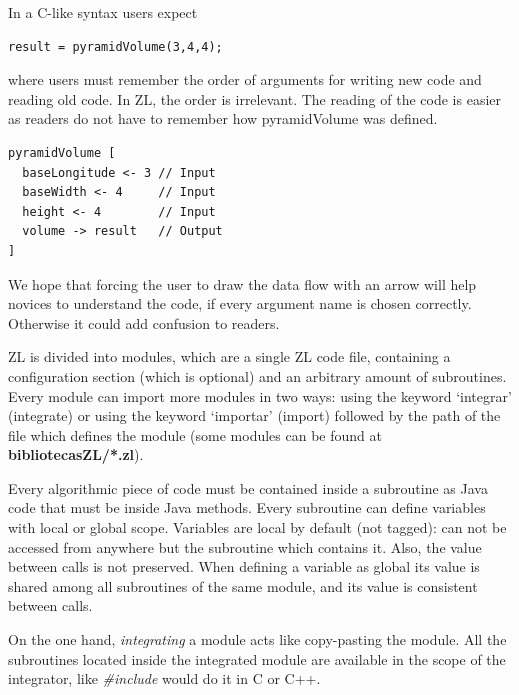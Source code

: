 \documentclass{report}
\begin{document}
	In a C-like syntax users expect
	
		\vspace{10px}
	
\begin{BVerbatim}
result = pyramidVolume(3,4,4);
\end{BVerbatim}
	
	\vspace{10px}
	
	where users must remember the order of arguments 
	for writing new code and reading old code.
	In ZL, the order is irrelevant. The reading of the code 
	is easier as readers do not have to remember how 
	pyramidVolume was defined. 
	
	\vspace{10px}
	
\begin{BVerbatim}
pyramidVolume [
  baseLongitude <- 3 // Input 
  baseWidth <- 4     // Input
  height <- 4        // Input
  volume -> result   // Output
]
\end{BVerbatim}

	\vspace{10px}

	We hope that forcing the user to draw the data flow with an arrow will help novices to understand the code, if every argument name is chosen correctly. Otherwise it could add confusion to readers.

	ZL is divided into modules, which are a single ZL code file, containing a configuration section (which is optional) and an arbitrary amount of subroutines. Every module can import more modules in two ways: using the keyword `integrar' (integrate) or using the keyword `importar' (import) followed by the path of the file which defines the module (some modules can be found at \textbf{bibliotecasZL/*.zl}).
	
	
	Every algorithmic piece of code must be contained inside a subroutine as Java code that must be inside Java methods. Every subroutine can define variables with local or global scope. Variables are local by default (not tagged): can not be accessed from anywhere but the subroutine which contains it. Also, the value between calls is not preserved. When defining a variable as global its value is shared among all subroutines of the same module, and its value is consistent between calls.  
	
	On the one hand, \textit{integrating} a module acts like copy-pasting the module. All the subroutines located inside the integrated module are available in the scope of the integrator, like \textit{\#include} would do it in C or C++.
	
\end{document}
